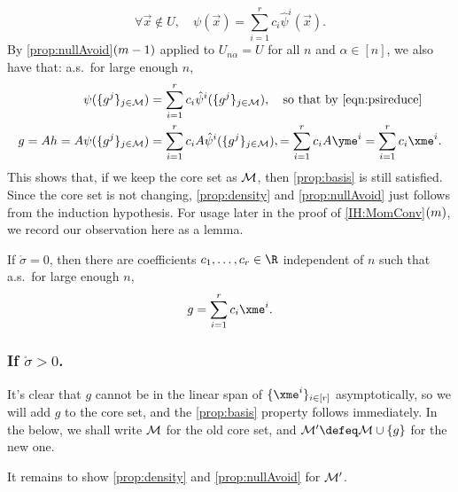 \documentclass[main.tex]{subfiles}
\begin{document}
\begin{equation*}
\forall \vec x \not \in U,\quad \psi(\vec x) = \sum_{i=1}^r c_i {\hat \psi^i}(\vec x).
\end{equation*}
By \ref{prop:nullAvoid}$(m-1)$ applied to $U_{n\alpha} = U$ for all $n$ and $\alpha \in [n]$, we also have that: a.s.\ for large enough $n$,
\begin{align*}
\psi(\{g^j\}_{j \in \coreset})
&= \sum_{i=1}^r c_i {\hat \psi^i}(\{g^j\}_{j \in \coreset}),
\quad\text{so that by \cref{eqn:psireduce}}
\\
g = Ah = A \psi(\{g^j\}_{j \in \coreset})
&= \sum_{i=1}^r c_i A{\hat \psi^i}(\{g^j\}_{j \in \coreset}),
= \sum_{i=1}^r c_i A\yme^i
= \sum_{i=1}^r c_i \xme^i.
\end{align*}
This shows that, if we keep the core set as $\mathcal{M}$, then \ref{prop:basis} is still satisfied.
Since the core set is not changing, \ref{prop:density} and \ref{prop:nullAvoid} just follows from the induction hypothesis.
For usage later in the proof of \ref{IH:MomConv}$(m)$, we record our observation here as a lemma.
\begin{lemma}\label{lemma:limitSigmaIsZero}
If $\mathring \sigma = 0$, then there are coefficients $c_1, \ldots, c_r \in \R$ independent of $n$ such that a.s.\ for large enough $n$,
\[
g = \sum_{i = 1}^r c_i \xme^i.
\]
\end{lemma}

\subsubsection{If \texorpdfstring{$\mathring \sigma > 0$}{sigma converges to nonzero value a.s.}.}

\newcommand{\prvZ}{\mathcal{Z}}

It's clear that $g$ cannot be in the linear span of $\{\xme^i\}_{i\in[r]}$ asymptotically, so we will add $g$ to the core set, and the \ref{prop:basis} property follows immediately.
In the below, we shall write $\mathcal{M}$ for the old core set, and $\coreset' \defeq \coreset \cup \{g\}$ for the new one.

It remains to show \ref{prop:density} and \ref{prop:nullAvoid} for $\mathcal{M}'$.
\end{document}
